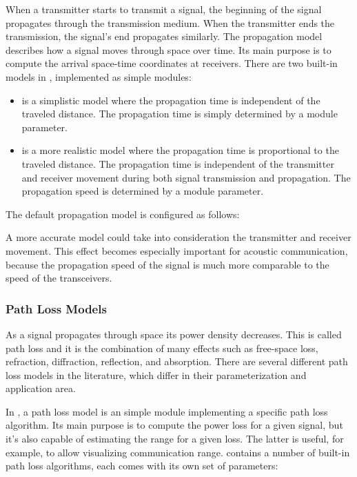 When a transmitter starts to transmit a signal, the beginning of the signal propagates through the transmission medium. When the transmitter ends the transmission, the signal's end propagates similarly. The propagation model describes how a signal moves through space over time. Its main purpose is to compute the arrival space-time coordinates at receivers. There are two built-in models in \inet, implemented as simple modules:

\begin{itemize}
        \item {} is a simplistic model where the propagation time is independent of the traveled distance. The propagation time is simply determined by a module parameter.
        \item {} is a more realistic model where the propagation time is proportional to the traveled distance. The propagation time is independent of the transmitter and receiver movement during both signal transmission and propagation. The propagation speed is determined by a module parameter.
\end{itemize}

The default propagation model is configured as follows:


A more accurate model could take into consideration the transmitter and receiver movement. This effect becomes especially important for acoustic communication, because the propagation speed of the signal is much more comparable to the speed of the transceivers.

\subsubsection*{Path Loss Models}

As a signal propagates through space its power density decreases. This is called path loss and it is the combination of many effects such as free-space loss, refraction, diffraction, reflection, and absorption. There are several different path loss models in the literature, which differ in their parameterization and application area.

In \inet, a path loss model is an \omnet simple module implementing a specific path loss algorithm. Its main purpose is to compute the power loss for a given signal, but it's also capable of estimating the range for a given loss. The latter is useful, for example, to allow visualizing communication range. \inet contains a number of built-in path loss algorithms, each comes with its own set of parameters:

